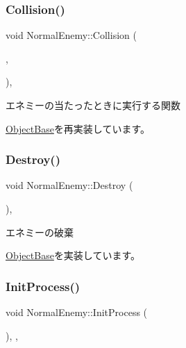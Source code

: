 \subsubsection{\texorpdfstring{Collision()}{Collision()}}
{\footnotesize\ttfamily void Normal\+Enemy\+::\+Collision (\begin{DoxyParamCaption}\item[{\mbox{\hyperlink{class_object_base}{Object\+Base}} $\ast$}]{,  }\item[{\mbox{\hyperlink{transform_8h_afb0c5e21d4133ff4f200992c0b534e1b}{V\+E\+C2}}}]{ }\end{DoxyParamCaption})\hspace{0.3cm}{\ttfamily [final]}, {\ttfamily [virtual]}}



エネミーの当たったときに実行する関数 



\mbox{\hyperlink{class_object_base_ad772d7a42f5e46c39481f5db22ee8193}{Object\+Base}}を再実装しています。

\mbox{\label{class_normal_enemy_a8a4271b6da6c7679d134d1c08125815b}} 
\subsubsection{\texorpdfstring{Destroy()}{Destroy()}}
{\footnotesize\ttfamily void Normal\+Enemy\+::\+Destroy (\begin{DoxyParamCaption}{ }\end{DoxyParamCaption})\hspace{0.3cm}{\ttfamily [final]}, {\ttfamily [virtual]}}



エネミーの破棄 



\mbox{\hyperlink{class_object_base_a7fa4c548153c3af20f89673ffea809af}{Object\+Base}}を実装しています。

\mbox{\label{class_normal_enemy_ae45bd9535595f810d065b92f8dd63342}} 
\subsubsection{\texorpdfstring{Init\+Process()}{InitProcess()}}
{\footnotesize\ttfamily void Normal\+Enemy\+::\+Init\+Process (\begin{DoxyParamCaption}{ }\end{DoxyParamCaption})\hspace{0.3cm}{\ttfamily [final]}, {\ttfamily [protected]}, {\ttfamily [virtual]}}



